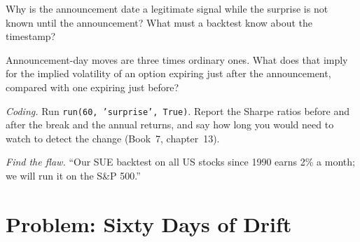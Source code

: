 \begin{exercise}[$\star\star$]\label{exo:s1:earnings:5}
Why is the announcement date a legitimate signal while the surprise is not known until the announcement? What must a backtest know about the timestamp?
\end{exercise}

\begin{exercise}[$\star\star$]\label{exo:s1:earnings:6}
Announcement-day moves are three times ordinary ones. What does that imply for the implied volatility of an option expiring just after the announcement,
compared with one expiring just before?
\end{exercise}

\begin{exercise}[$\star\star\star$]\label{exo:s1:earnings:7}
\emph{Coding.} Run \texttt{run(60, 'surprise', True)}. Report the Sharpe ratios before and after the break and the annual returns, and say how long you
would need to watch to detect the change (Book~7, chapter~13).
\end{exercise}

\begin{exercise}[$\star\star\star$]\label{exo:s1:earnings:8}
\emph{Find the flaw.} ``Our SUE backtest on all US stocks since 1990 earns 2\% a month; we will run it on the S\&P 500.''
\end{exercise}

\section{Problem: Sixty Days of Drift}

